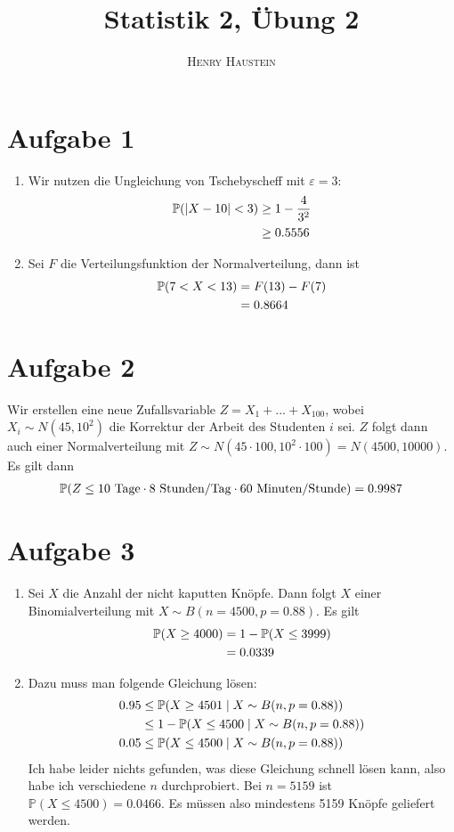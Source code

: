 \documentclass{article}
\title{\textbf{Statistik 2, Übung 2}}
\author{\textsc{Henry Haustein}}
\date{}
\renewcommand{\P}{\mathbb{P}}
\begin{document}
	\maketitle
	
	\section*{Aufgabe 1}
	\begin{enumerate}[label=(\alph*)]
		\item Wir nutzen die Ungleichung von Tschebyscheff mit $\varepsilon=3$:
		\begin{align}
			\P(\vert X-10\vert < 3) &\ge 1 - \frac{4}{3^2} \notag \\
			&\ge 0.5556 \notag
		\end{align}
		\item Sei $F$ die Verteilungsfunktion der Normalverteilung, dann ist
		\begin{align}
			\P(7 < X < 13) &= F(13) - F(7) \notag \\
			&= 0.8664 \notag
		\end{align}
	\end{enumerate}

	\section*{Aufgabe 2}
	Wir erstellen eine neue Zufallsvariable $Z=X_1 + ... + X_{100}$, wobei $X_i\sim N(45,10^2)$ die Korrektur der Arbeit des Studenten $i$ sei. $Z$ folgt dann auch einer Normalverteilung mit $Z\sim N(45\cdot 100, 10^2 \cdot 100) = N(4500,10000)$. Es gilt dann
	\begin{align}
		\P(Z \le 10 \text{ Tage} \cdot 8 \text{ Stunden/Tag} \cdot 60 \text{ Minuten/Stunde}) = 0.9987 \notag
	\end{align}

	\section*{Aufgabe 3}
	\begin{enumerate}[label=(\alph*)]
		\item Sei $X$ die Anzahl der nicht kaputten Knöpfe. Dann folgt $X$ einer Binomialverteilung mit $X\sim B(n=4500,p=0.88)$. Es gilt
		\begin{align}
			\P(X \ge 4000) &= 1- \P(X \le 3999) \notag \\
			&= 0.0339 \notag
		\end{align}
		\item Dazu muss man folgende Gleichung lösen:
		\begin{align}
			0.95 &\le \P(X\ge 4501\mid X\sim B(n,p=0.88)) \notag \\
			&\le 1 - \P(X\le 4500\mid X\sim B(n,p=0.88)) \notag \\
			0.05 &\le \P(X\le 4500\mid X\sim B(n,p=0.88)) \notag
		\end{align}
		Ich habe leider nichts gefunden, was diese Gleichung schnell lösen kann, also habe ich verschiedene $n$ durchprobiert. Bei $n=5159$ ist $\P(X\le 4500) = 0.0466$. Es müssen also mindestens 5159 Knöpfe geliefert werden.
	\end{enumerate}
\end{document}
